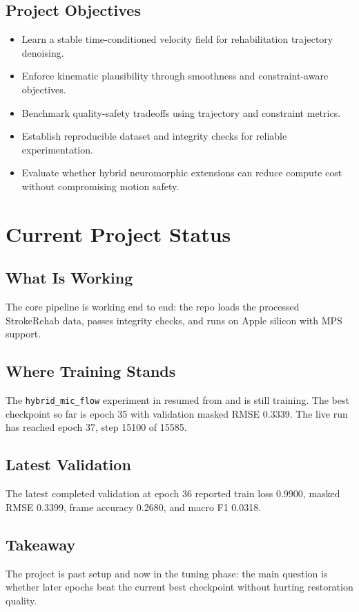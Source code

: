 \documentclass[11pt]{article}
\begin{document}
\subsection*{Project Objectives}
\begin{itemize}
  \item Learn a stable time-conditioned velocity field for rehabilitation trajectory denoising.
  \item Enforce kinematic plausibility through smoothness and constraint-aware objectives.
  \item Benchmark quality-safety tradeoffs using trajectory and constraint metrics.
  \item Establish reproducible dataset and integrity checks for reliable experimentation.
  \item Evaluate whether hybrid neuromorphic extensions can reduce compute cost without compromising motion safety.
\end{itemize}

\section{Current Project Status}
\subsection*{What Is Working}
The core pipeline is working end to end: the repo loads the processed StrokeRehab data, passes integrity checks, and runs on Apple silicon with MPS support.

\subsection*{Where Training Stands}
The \texttt{hybrid\_mic\_flow} experiment in  resumed from  and is still training. The best checkpoint so far is epoch 35 with validation masked RMSE 0.3339. The live run has reached epoch 37, step 15100 of 15585.

\subsection*{Latest Validation}
The latest completed validation at epoch 36 reported train loss 0.9900, masked RMSE 0.3399, frame accuracy 0.2680, and macro F1 0.0318.

\subsection*{Takeaway}
The project is past setup and now in the tuning phase: the main question is whether later epochs beat the current best checkpoint without hurting restoration quality.
\end{document}
